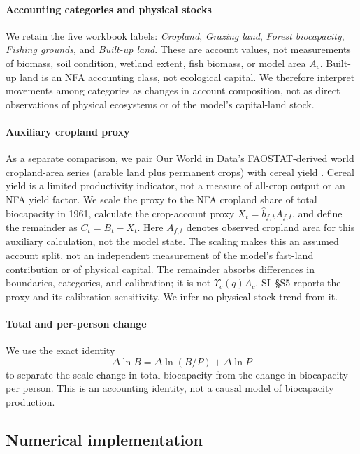 \documentclass[preprint,12pt,authoryear]{elsarticle}
\newcommand{\Ups}{\Upsilon_c}
\begin{document}
\paragraph{Accounting categories and physical stocks} We retain the five workbook labels: \emph{Cropland}, \emph{Grazing land}, \emph{Forest biocapacity}, \emph{Fishing grounds}, and \emph{Built-up land}. These are account values, not measurements of biomass, soil condition, wetland extent, fish biomass, or model area $A_c$. Built-up land is an NFA accounting class, not ecological capital. We therefore interpret movements among categories as changes in account composition, not as direct observations of physical ecosystems or of the model's capital-land stock.

\paragraph{Auxiliary cropland proxy} As a separate comparison, we pair Our World in Data's FAOSTAT-derived world cropland-area series (arable land plus permanent crops) with cereal yield \citep{OWIDCropland2026,OWIDCereal2026}. Cereal yield is a limited productivity indicator, not a measure of all-crop output or an NFA yield factor. We scale the proxy to the NFA cropland share of total biocapacity in 1961, calculate the crop-account proxy $X_t=\hat b_{f,t}A_{f,t}$, and define the remainder as $C_t=B_t-X_t$. Here $A_{f,t}$ denotes observed cropland area for this auxiliary calculation, not the model state. The scaling makes this an assumed account split, not an independent measurement of the model's fast-land contribution or of physical capital. The remainder absorbs differences in boundaries, categories, and calibration; it is not $\Ups(q)A_c$. SI~\S S5 reports the proxy and its calibration sensitivity. We infer no physical-stock trend from it.

\paragraph{Total and per-person change} We use the exact identity
\begin{equation*}
\Delta\ln B=\Delta\ln(B/P)+\Delta\ln P
\end{equation*}
to separate the scale change in total biocapacity from the change in biocapacity per person. This is an accounting identity, not a causal model of biocapacity production.

\subsection{Numerical implementation}\label{sec:numerics}
\end{document}
